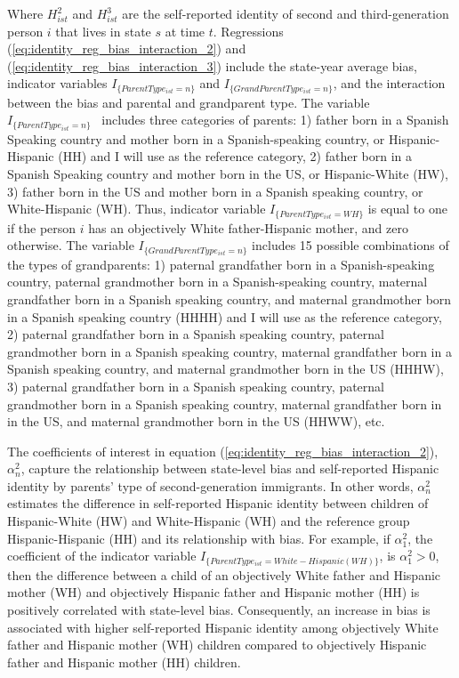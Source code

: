 \documentclass[12pt, fullpage]{article}
\begin{document}
Where $H_{ist}^2$ and $H_{ist}^3$ are the self-reported identity of second and third-generation person $i$ that lives in state $s$ at time $t$. Regressions (\ref{eq:identity_reg_bias_interaction_2}) and (\ref{eq:identity_reg_bias_interaction_3}) include the state-year average bias, indicator variables $I_{\{ParentType_{ist} = n\}}$ and $I_{\{GrandParentType_{ist} = n\}}$, and the interaction between the bias and parental and grandparent type. The variable ~$I_{\{ParentType_{ist} = n\}}$ ~includes three categories of parents: 1) father born in a Spanish Speaking country and mother born in a Spanish-speaking country, or Hispanic-Hispanic (HH) and I will use as the reference category, 2) father born in a Spanish Speaking country and mother born in the US, or Hispanic-White (HW), 3) father born in the US and mother born in a Spanish speaking country, or White-Hispanic (WH). Thus, indicator variable $I_{\{ParentType_{ist} = WH \}}$ is equal to one if the person $i$ has an objectively White father-Hispanic mother, and zero otherwise. The variable $I_{\{GrandParentType_{ist} = n\}}$ includes 15 possible combinations of the types of grandparents: 1) paternal grandfather born in a Spanish-speaking country, paternal grandmother born in a Spanish-speaking country, maternal grandfather born in a Spanish speaking country, and maternal grandmother born in a Spanish speaking country (HHHH) and I will use as the reference category, 2) paternal grandfather born in a Spanish speaking country, paternal grandmother born in a Spanish speaking country, maternal grandfather born in a Spanish speaking country, and maternal grandmother born in the US (HHHW), 3) paternal grandfather born in a Spanish speaking country, paternal grandmother born in a Spanish speaking country, maternal grandfather born in in the US, and maternal grandmother born in the US (HHWW), etc. 

The coefficients of interest in equation (\ref{eq:identity_reg_bias_interaction_2}), $\alpha_n^2$, capture the relationship between state-level bias and self-reported Hispanic identity by parents' type of second-generation immigrants. In other words, $\alpha_n^2$ estimates the difference in self-reported Hispanic identity between children of Hispanic-White (HW) and White-Hispanic (WH) and the reference group Hispanic-Hispanic (HH) and its relationship with bias. For example, if $\alpha_1^2$, the coefficient of the indicator variable $I_{\{ParentType_{ist} = White-Hispanic (WH)\}}$, is $\alpha_1^2 > 0$, then the difference between a child of an objectively White father and Hispanic mother (WH) and objectively Hispanic father and Hispanic mother (HH) is positively correlated with state-level bias. Consequently, an increase in bias is associated with higher self-reported Hispanic identity among objectively White father and Hispanic mother (WH) children compared to objectively Hispanic father and Hispanic mother (HH) children. 
\end{document}
